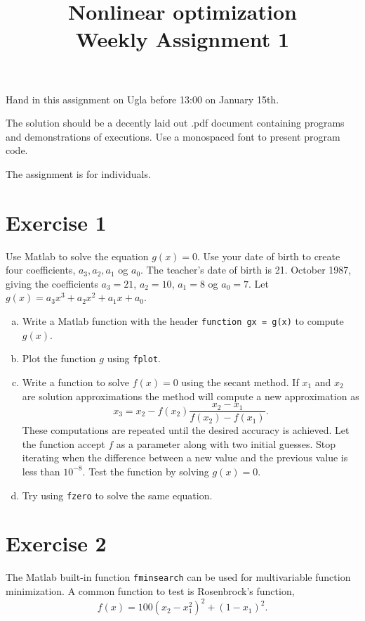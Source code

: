 \documentclass{article}
\title{Nonlinear optimization \\ Weekly Assignment 1}
\author{}
\begin{document}
\maketitle

Hand in this assignment on Ugla before 13:00 on January 15th.

The solution should be a decently laid out .pdf document containing programs and demonstrations of executions. Use a monospaced font to present program code.

The assignment is for individuals.

\section{Exercise 1}

Use Matlab to solve the equation $g(x) = 0$. Use your date of birth to create four coefficients, $a_3, a_2, a_1$ og $a_0$. The teacher's date of birth is 21. October 1987, giving the coefficients $a_3 = 21$, $a_2 = 10$, $a_1 = 8$ og $a_0 = 7$. Let $g(x) = a_3x^3 + a_2x^2 + a_1x + a_0$.

\begin{enumerate}[a)]
    \item Write a Matlab function with the header \texttt{function gx = g(x)} to compute $g(x)$.
    \item Plot the function $g$ using \texttt{fplot}.
    \item Write a function to solve $f(x) = 0$ using the secant method. If $x_1$ and $x_2$ are solution approximations the method will compute a new approximation as
    \[
        x_3 = x_2 - f(x_2)\frac{x_2-x_1}{f(x_2) - f(x_1)}.
    \]
    These computations are repeated until the desired accuracy is achieved.
    Let the function accept $f$ as a parameter along with two initial guesses. Stop iterating when the difference between a new value and the previous value is less than $10^{-8}$. Test the function by solving $g(x) = 0$.
    \item Try using \texttt{fzero} to solve the same equation.
\end{enumerate}

\section{Exercise 2} 

The Matlab built-in function \texttt{fminsearch} can be used for multivariable function minimization. A common function to test is Rosenbrock's function,
\[
    f(x)  = 100(x_2 - x_1^2)^2 + (1-x_1)^2.
\]
\end{document}
